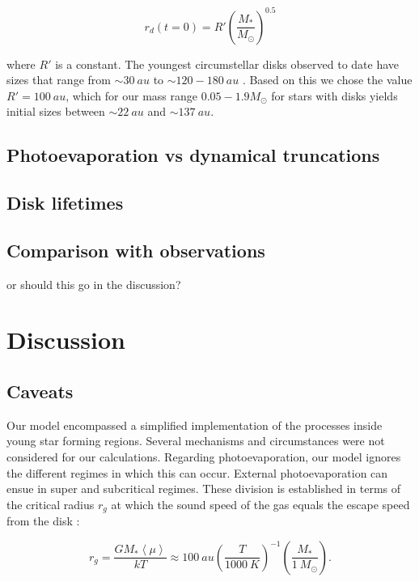\documentclass[fleqn,usenatbib]{mnras}
\newcommand\note[1]{{\colorbox{yellow!60}{\color{magenta}#1}}}
\begin{document}
\begin{equation}
r_d(t=0) = R'\left(\frac{M_*}{M_\odot}\right)^{0.5}
\end{equation}

\noindent
where $R'$ is a constant. The youngest circumstellar disks observed to date have sizes that range from $\sim\SI{30}{au}$ \citep[e.g.][]{lee2018} to $\sim120-\SI{180}{au}$ \citep[e.g.][]{murillo2013,vanthoff2018}. Based on this we chose the value $R' = \SI{100}{au}$, which for our mass range $0.05-1.9 M_\odot$ for stars with disks yields initial sizes between $\sim\SI{22}{au}$ and $\sim\SI{137}{au}$.

\subsection{Photoevaporation vs dynamical truncations}

\subsection{Disk lifetimes}

\subsection{Comparison with observations}
\note{or should this go in the discussion?}

\section{Discussion}
\label{sec:discussion}

\subsection{Caveats}
Our model encompassed a simplified implementation of the processes inside young star forming regions. Several mechanisms and circumstances were not considered for our calculations. Regarding photoevaporation, our model ignores the different regimes in which this can occur. External photoevaporation can ensue in super and subcritical regimes. These division is established in terms of the critical radius $r_g$ at which the sound speed of the gas equals the escape speed from the disk \citep{adams2004}:

\begin{equation}
r_g = \frac{GM_*\left\langle\mu\right\rangle}{kT} \approx \SI{100}{au} \left(\frac{T}{\SI{1000}{K}}\right)^{-1}\left(\frac{M_*}{\SI{1}{M_\odot}}\right).
\end{equation}
\end{document}
